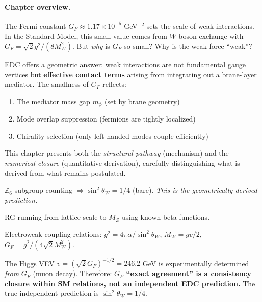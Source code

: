 \paragraph{Chapter overview.}
The Fermi constant $G_F \approx 1.17 \times 10^{-5}$ GeV$^{-2}$ sets the scale of
weak interactions. In the Standard Model, this small value comes from $W$-boson
exchange with $G_F = \sqrt{2}g^2/(8M_W^2)$. But \emph{why} is $G_F$ so small?
Why is the weak force ``weak''?

EDC offers a geometric answer: weak interactions are not fundamental gauge vertices
but \textbf{effective contact terms} arising from integrating out a brane-layer
mediator. The smallness of $G_F$ reflects:
\begin{enumerate}[nosep]
    \item The mediator mass gap $m_\phi$ (set by brane geometry)
    \item Mode overlap suppression (fermions are tightly localized)
    \item Chirality selection (only left-handed modes couple efficiently)
\end{enumerate}

This chapter presents both the \emph{structural pathway} (mechanism) and the
\emph{numerical closure} (quantitative derivation), carefully distinguishing what
is derived from what remains postulated.


\begin{tcolorbox}[colback=green!5, colframe=green!50!black,
    title=\textbf{Derivation Chain: What Is Independent vs.\ What Is Not}]
\begin{description}[style=nextline, leftmargin=1em, font=\normalfont\bfseries]
    \item[Independent EDC step \tagDer{}:]
        $\mathbb{Z}_6$ subgroup counting $\Rightarrow \sin^2\theta_W = 1/4$ (bare).
        \emph{This is the geometrically derived prediction.}

    \item[Standard physics step \tagBL{}:]
        RG running from lattice scale to $M_Z$ using known beta functions.

    \item[Derived identities \tagDc{}:]
        Electroweak coupling relations: $g^2 = 4\pi\alpha/\sin^2\theta_W$,
        $M_W = gv/2$, $G_F = g^2/(4\sqrt{2}M_W^2)$.

    \item[Circularity caveat (important):]
        The Higgs VEV $v = (\sqrt{2}G_F)^{-1/2} = 246.2$ GeV is experimentally
        determined \emph{from} $G_F$ (muon decay). Therefore:
        \textbf{$G_F$ ``exact agreement'' is a consistency closure within
        SM relations, not an independent EDC prediction.}
        The true independent prediction is $\sin^2\theta_W = 1/4$.
\end{description}
\end{tcolorbox}

